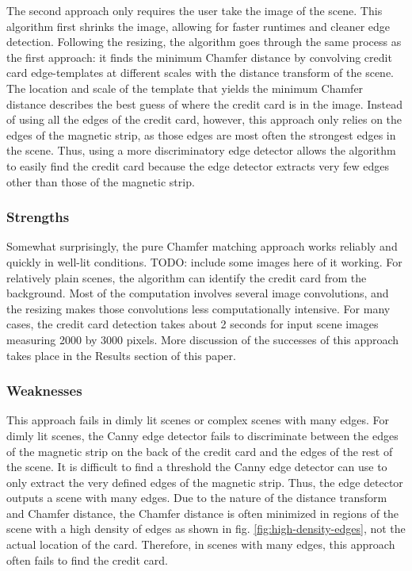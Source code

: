 \documentclass[10pt,twocolumn,letterpaper]{article}
\begin{document}
The second approach only requires the user take the image of the scene. This algorithm first shrinks the image, allowing for faster runtimes and cleaner edge detection. Following the resizing, the algorithm goes through the same process as the first approach: it finds the minimum Chamfer distance by convolving credit card edge-templates at different scales with the distance transform of the scene. The location and scale of the template that yields the minimum Chamfer distance describes the best guess of where the credit card is in the image. 
	Instead of using all the edges of the credit card, however, this approach only relies on the edges of the magnetic strip, as those edges are most often the strongest edges in the scene. Thus, using a more discriminatory edge detector allows the algorithm to easily find the credit card because the edge detector extracts very few edges other than those of the magnetic strip.

\subsubsection{Strengths}

	Somewhat surprisingly, the pure Chamfer matching approach works reliably and quickly in well-lit conditions. TODO: include some images here of it working. For relatively plain scenes, the algorithm can identify the credit card from the background. Most of the computation involves several image convolutions, and the resizing makes those convolutions less computationally intensive. For many cases, the credit card detection takes about 2 seconds for input scene images measuring 2000 by 3000 pixels. More discussion of the successes of this approach takes place in the Results section of this paper.
\subsubsection{Weaknesses}

	This approach fails in dimly lit scenes or complex scenes with many edges. For dimly lit scenes, the Canny edge detector fails to discriminate between the edges of the magnetic strip on the back of the credit card and the edges of the rest of the scene. It is difficult to find a threshold the Canny edge detector can use to only extract the very defined edges of the magnetic strip. Thus, the edge detector outputs a scene with many edges. Due to the nature of the distance transform and
    Chamfer distance, the Chamfer distance is often minimized in regions of the scene with a high density of edges as shown in fig. \ref{fig:high-density-edges}, not the actual location of the card. Therefore, in scenes with many edges, this approach often fails to find the credit card.
	
\end{document}
